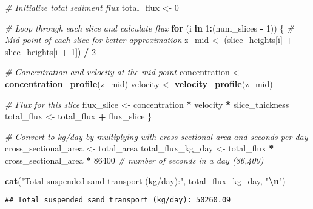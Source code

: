 \documentclass[
]{article}
\newenvironment{Shaded}{\begin{snugshade}}{\end{snugshade}}
\newcommand{\CommentTok}[1]{\textcolor[rgb]{0.56,0.35,0.01}{\textit{#1}}}
\newcommand{\ControlFlowTok}[1]{\textcolor[rgb]{0.13,0.29,0.53}{\textbf{#1}}}
\newcommand{\DecValTok}[1]{\textcolor[rgb]{0.00,0.00,0.81}{#1}}
\newcommand{\FunctionTok}[1]{\textcolor[rgb]{0.13,0.29,0.53}{\textbf{#1}}}
\newcommand{\NormalTok}[1]{#1}
\newcommand{\OtherTok}[1]{\textcolor[rgb]{0.56,0.35,0.01}{#1}}
\newcommand{\SpecialCharTok}[1]{\textcolor[rgb]{0.81,0.36,0.00}{\textbf{#1}}}
\newcommand{\StringTok}[1]{\textcolor[rgb]{0.31,0.60,0.02}{#1}}
\begin{document}
\begin{Shaded}
\begin{Highlighting}[]
\CommentTok{\# Initialize total sediment flux}
\NormalTok{total\_flux }\OtherTok{\textless{}{-}} \DecValTok{0}

\CommentTok{\# Loop through each slice and calculate flux}
\ControlFlowTok{for}\NormalTok{ (i }\ControlFlowTok{in} \DecValTok{1}\SpecialCharTok{:}\NormalTok{(num\_slices }\SpecialCharTok{{-}} \DecValTok{1}\NormalTok{)) \{}
  \CommentTok{\# Mid{-}point of each slice for better approximation}
\NormalTok{  z\_mid }\OtherTok{\textless{}{-}}\NormalTok{ (slice\_heights[i] }\SpecialCharTok{+}\NormalTok{ slice\_heights[i }\SpecialCharTok{+} \DecValTok{1}\NormalTok{]) }\SpecialCharTok{/} \DecValTok{2}
  
  \CommentTok{\# Concentration and velocity at the mid{-}point}
\NormalTok{  concentration }\OtherTok{\textless{}{-}} \FunctionTok{concentration\_profile}\NormalTok{(z\_mid)}
\NormalTok{  velocity }\OtherTok{\textless{}{-}} \FunctionTok{velocity\_profile}\NormalTok{(z\_mid)}
  
  \CommentTok{\# Flux for this slice}
\NormalTok{  flux\_slice }\OtherTok{\textless{}{-}}\NormalTok{ concentration }\SpecialCharTok{*}\NormalTok{ velocity }\SpecialCharTok{*}\NormalTok{ slice\_thickness}
\NormalTok{  total\_flux }\OtherTok{\textless{}{-}}\NormalTok{ total\_flux }\SpecialCharTok{+}\NormalTok{ flux\_slice}
\NormalTok{\}}

\CommentTok{\# Convert to kg/day by multiplying with cross{-}sectional area and seconds per day}
\NormalTok{cross\_sectional\_area }\OtherTok{\textless{}{-}}\NormalTok{ total\_area   }
\NormalTok{total\_flux\_kg\_day }\OtherTok{\textless{}{-}}\NormalTok{ total\_flux }\SpecialCharTok{*}\NormalTok{ cross\_sectional\_area }\SpecialCharTok{*} \DecValTok{86400} \CommentTok{\# number of seconds in a day (86,400)}

\FunctionTok{cat}\NormalTok{(}\StringTok{"Total suspended sand transport (kg/day):"}\NormalTok{, total\_flux\_kg\_day, }\StringTok{"}\SpecialCharTok{\textbackslash{}n}\StringTok{"}\NormalTok{)}
\end{Highlighting}
\end{Shaded}

\begin{verbatim}
## Total suspended sand transport (kg/day): 50260.09
\end{verbatim}
\end{document}
